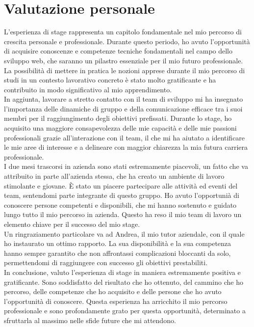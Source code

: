 \section{Valutazione personale}\label{sec:valutazione-personale}

L'esperienza di stage rappresenta un capitolo fondamentale nel mio percorso di crescita personale e professionale. Durante questo periodo, ho avuto l'opportunità di acquisire conoscenze e competenze tecniche 
fondamentali nel campo dello sviluppo web, che saranno un pilastro essenziale per il mio futuro professionale. La possibilità di mettere in pratica le nozioni apprese durante il mio percorso di studi in un contesto
lavorativo concreto è stato molto gratificante e ha contribuito in modo significativo al mio apprendimento.\\
In aggiunta, lavorare a stretto contatto con il team di sviluppo mi ha insegnato l'importanza delle dinamiche di gruppo e della comunicazione efficace tra i suoi membri per il raggiungimento degli obiettivi prefissati.
Durante lo stage, ho acquisito una maggiore consapevolezza delle mie capacità e delle mie passioni professionali grazie all'interazione con il team, il che mi ha aiutato a identificare le mie aree di interesse e a delineare con maggior chiarezza la mia futura carriera professionale.\\
I due mesi trascorsi in azienda sono stati estremamente piacevoli, un fatto che va attribuito in parte all'azienda stessa, che ha creato un ambiente di lavoro stimolante e giovane.
È stato un piacere partecipare alle attività ed eventi del team, sentendomi parte integrante di questo gruppo. Ho avuto l'opportunià di conoscere persone competenti e disponibili, che mi hanno sostenuto e guidato 
lungo tutto il mio percorso in azienda. Questo ha reso il mio team di lavoro un elemento chiave per il successo del mio stage.\\
Un ringraziamento particolare va ad Andrea, il mio tutor aziendale, con il quale ho instaurato un ottimo rapporto. La sua disponibilità e la sua competenza hanno sempre garantito che non affrontassi complicazioni bloccanti da solo, 
permettendomi di raggiungere con successo gli obiettivi prestabiliti.\\

In conclusione, valuto l'esperienza di stage in maniera estremamente positiva e gratificante. Sono soddisfatto del risultato che ho ottenuto, del cammino che ho percorso, delle competenze 
che ho acquisito e delle persone che ho avuto l'opportunità di conoscere. Questa esperienza ha arricchito il mio percorso professionale e sono profondamente grato per questa opportunità, 
determinato a sfruttarla al massimo nelle sfide future che mi attendono.
